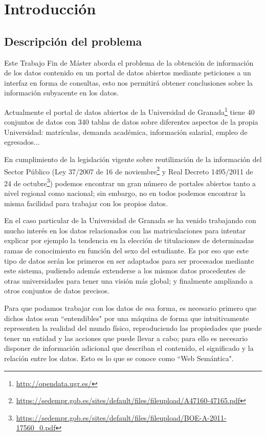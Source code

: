 \chapter{Introducción}

\section{Descripción del problema}

Este Trabajo Fin de Máster aborda el problema de la obtención de información de los datos contenido en un portal de datos abiertos mediante peticiones a un interfaz en forma de consultas, esto nos permitirá obtener conclusiones sobre la información subyacente en los datos.

\bigskip
Actualmente el portal de datos abiertos de la Universidad de Granada\footnote{\url{http://opendata.ugr.es/}} tiene 40 conjuntos de datos con 340 tablas de datos sobre diferentes aspectos de la propia Universidad: matrículas, demanda académica, información salarial, empleo de egresados...

\bigskip
En cumplimiento de la legislación vigente sobre reutilización de la información del Sector Público (Ley 37/2007 de 16 de noviembre\footnote{\url{https://sedempr.gob.es/sites/default/files/fileupload/A47160-47165.pdf}} y Real Decreto 1495/2011 de 24 de octubre\footnote{\url{https://sedempr.gob.es/sites/default/files/fileupload/BOE-A-2011-17560\_0.pdf}}) podemos encontrar un gran número de portales abiertos tanto a nivel regional como nacional; sin embargo, no en todos podemos encontrar la misma facilidad para trabajar con los propios datos.

\bigskip
En el caso particular de la Universidad de Granada se ha venido trabajando con mucho interés en los datos relacionados con las matriculaciones para intentar explicar por ejemplo la tendencia en la elección de titulaciones de determinadas ramas de conocimiento en función del sexo del estudiante. Es por eso que este tipo de datos serán los primeros en ser adaptados para ser procesados mediante este sistema, pudiendo además extenderse a los mismos datos procedentes de otras universidades para tener una visión más global; y finalmente ampliando a otros conjuntos de datos precisos. 

\newpage
Para que podamos trabajar con los datos de esa forma, es necesario primero que dichos datos sean ``entendibles" por una máquina de forma que intuitivamente representen la realidad del mundo físico, reproduciendo las propiedades que puede tener un entidad y las acciones que puede llevar a cabo; para ello es necesario disponer de información adicional que describan el contenido, el significado y la relación entre los datos. Esto es lo que se conoce como ``Web Semántica".

